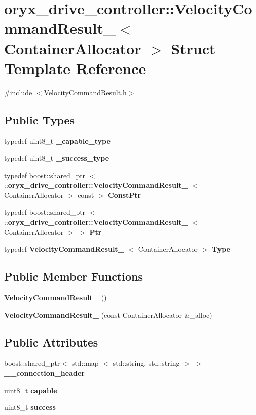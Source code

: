 \section{oryx\-\_\-drive\-\_\-controller\-:\-:\-Velocity\-Command\-Result\-\_\-$<$ \-Container\-Allocator $>$ \-Struct \-Template \-Reference}
\label{structoryx__drive__controller_1_1VelocityCommandResult__}


{\ttfamily \#include $<$\-Velocity\-Command\-Result.\-h$>$}

\subsection*{\-Public \-Types}
\begin{DoxyCompactItemize}
\item 
typedef uint8\-\_\-t {\bf \-\_\-capable\-\_\-type}
\item 
typedef uint8\-\_\-t {\bf \-\_\-success\-\_\-type}
\item 
typedef boost\-::shared\-\_\-ptr\*
$<$ \-::{\bf oryx\-\_\-drive\-\_\-controller\-::\-Velocity\-Command\-Result\-\_\-}\*
$<$ \-Container\-Allocator $>$ const  $>$ {\bf \-Const\-Ptr}
\item 
typedef boost\-::shared\-\_\-ptr\*
$<$ \-::{\bf oryx\-\_\-drive\-\_\-controller\-::\-Velocity\-Command\-Result\-\_\-}\*
$<$ \-Container\-Allocator $>$ $>$ {\bf \-Ptr}
\item 
typedef {\bf \-Velocity\-Command\-Result\-\_\-}\*
$<$ \-Container\-Allocator $>$ {\bf \-Type}
\end{DoxyCompactItemize}
\subsection*{\-Public \-Member \-Functions}
\begin{DoxyCompactItemize}
\item 
{\bf \-Velocity\-Command\-Result\-\_\-} ()
\item 
{\bf \-Velocity\-Command\-Result\-\_\-} (const \-Container\-Allocator \&\-\_\-alloc)
\end{DoxyCompactItemize}
\subsection*{\-Public \-Attributes}
\begin{DoxyCompactItemize}
\item 
boost\-::shared\-\_\-ptr$<$ std\-::map\*
$<$ std\-::string, std\-::string $>$ $>$ {\bf \-\_\-\-\_\-connection\-\_\-header}
\item 
uint8\-\_\-t {\bf capable}
\item 
uint8\-\_\-t {\bf success}
\end{DoxyCompactItemize}


